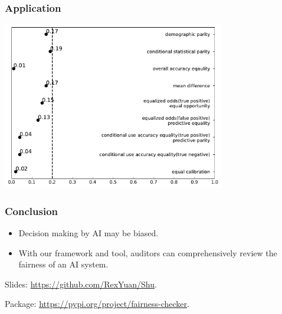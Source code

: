 \documentclass{beamer}
\begin{document}
\begin{frame}
    \frametitle{Application}
    \centering
    \includegraphics[width=0.73\textwidth]{Caucasian}
\end{frame}

\begin{frame}
    \frametitle{Conclusion}
    \begin{itemize}
        \item Decision making by AI may be biased.
        \item With our framework and tool, auditors can comprehensively
        review the fairness of an AI system.
    \end{itemize}

    Slides: \url{https://github.com/RexYuan/Shu}.

    Package: \url{https://pypi.org/project/fairness-checker}.
\end{frame}
\end{document}
